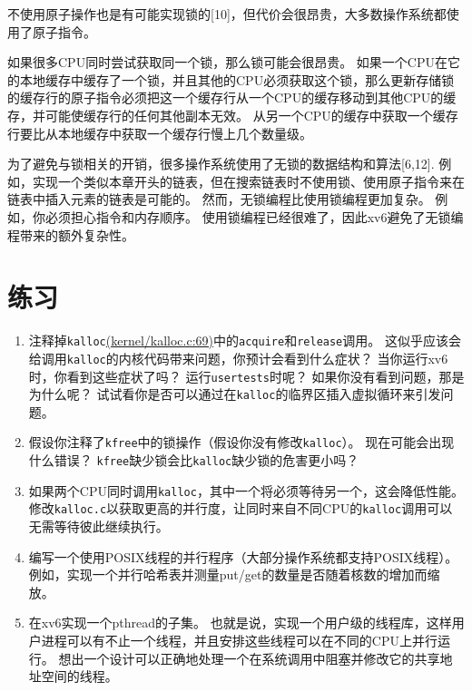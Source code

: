 不使用原子操作也是有可能实现锁的[10]，但代价会很昂贵，大多数操作系统都使用了原子指令。

如果很多CPU同时尝试获取同一个锁，那么锁可能会很昂贵。
如果一个CPU在它的本地缓存中缓存了一个锁，并且其他的CPU必须获取这个锁，那么更新存储锁的缓存行的原子指令必须把这一个缓存行从一个CPU的缓存移动到其他CPU的缓存，并可能使缓存行的任何其他副本无效。
从另一个CPU的缓存中获取一个缓存行要比从本地缓存中获取一个缓存行慢上几个数量级。

为了避免与锁相关的开销，很多操作系统使用了无锁的数据结构和算法[6,12].
例如，实现一个类似本章开头的链表，但在搜索链表时不使用锁、使用原子指令来在链表中插入元素的链表是可能的。
然而，无锁编程比使用锁编程更加复杂。
例如，你必须担心指令和内存顺序。
使用锁编程已经很难了，因此xv6避免了无锁编程带来的额外复杂性。

\section{练习}
\begin{enumerate}
    \item 注释掉\texttt{kalloc}\href{https://github.com/mit-pdos/xv6-riscv/blob/risc/kernel/kalloc.c#L69}{(kernel/kalloc.c:69)}中的\texttt{acquire}和\texttt{release}调用。
    这似乎应该会给调用\texttt{kalloc}的内核代码带来问题，你预计会看到什么症状？
    当你运行xv6时，你看到这些症状了吗？
    运行\texttt{usertests}时呢？
    如果你没有看到问题，那是为什么呢？
    试试看你是否可以通过在\texttt{kalloc}的临界区插入虚拟循环来引发问题。
    \item 假设你注释了\texttt{kfree}中的锁操作（假设你没有修改\texttt{kalloc}）。
    现在可能会出现什么错误？
    \texttt{kfree}缺少锁会比\texttt{kalloc}缺少锁的危害更小吗？
    \item 如果两个CPU同时调用\texttt{kalloc}，其中一个将必须等待另一个，这会降低性能。
    修改\texttt{kalloc.c}以获取更高的并行度，让同时来自不同CPU的\texttt{kalloc}调用可以无需等待彼此继续执行。
    \item 编写一个使用POSIX线程的并行程序（大部分操作系统都支持POSIX线程）。
    例如，实现一个并行哈希表并测量put/get的数量是否随着核数的增加而缩放。
    \item 在xv6实现一个pthread的子集。
    也就是说，实现一个用户级的线程库，这样用户进程可以有不止一个线程，并且安排这些线程可以在不同的CPU上并行运行。
    想出一个设计可以正确地处理一个在系统调用中阻塞并修改它的共享地址空间的线程。
\end{enumerate}
